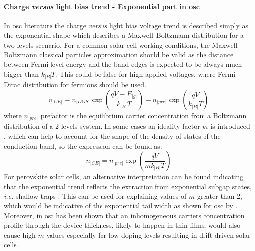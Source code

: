 		\paragraph{Charge \textit{versus} light bias trend - Exponential part in \gls{osc}}\label{ce_exp_osc}
		In \gls{osc} literature the charge \textit{versus} light bias voltage trend is described simply as the exponential shape which describes a Maxwell--Boltzmann distribution for a two levels scenario.
		For a common solar cell working conditions, the Maxwell-Boltzmann classical particles approximation should be valid as the distance between Fermi level energy and the band edges is expected to be always much bigger than $k_|B|T$.
		This could be false for high applied voltages, where Fermi-Dirac distribution for fermions should be used.
		$$n_|CE| = n_|DOS| \exp(\frac{qV - E_|g|}{k_|B|T}) = n_|pre| \exp(\frac{qV}{k_|B|T})$$
		where $n_|pre|$ prefactor is the equilibrium carrier concentration from a Boltzmann distribution of a 2 levels system. %
		In some cases an ideality factor $m$ is introduced \cite{Kirchartz2012}, which can help to account for the shape of the density of states of the conduction band, so the expression can be found as:
		\begin{equation}\label{eq:ce_osc}
			n_|CE| = n_|pre| \exp(\frac{qV}{mk_|B|T})
		\end{equation}
		For perovskite solar cells, an alternative interpretation can be found indicating that the exponential trend reflects the extraction from exponential subgap states, \textit{i.e.} shallow traps \cite{Du2018}.
		This can be used for explaining values of $m$ greater than 2, which would be indicative of the exponential tail width as shown for \gls{osc} by .
		Moreover, in \gls{osc} has been shown that an inhomogeneous carriers concentration profile through the device thickness, likely to happen in thin films, would also cause high $m$ values \cite{Kirchartz2012} especially for low doping levels resulting in drift-driven solar cells \cite{Deledalle2015,Deledalle2014}.
		
